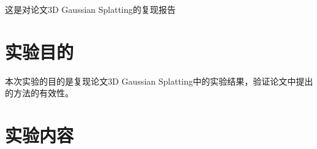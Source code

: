 这是对论文3D Gaussian Splatting的复现报告

\section{实验目的}

本次实验的目的是复现论文3D Gaussian Splatting中的实验结果，验证论文中提出的方法的有效性。

\section{实验内容}
